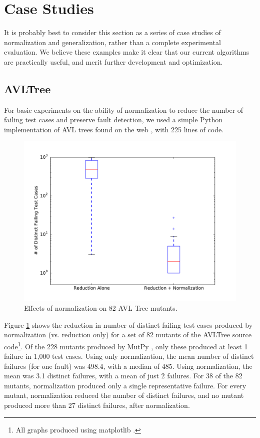 \section {Case Studies}

It is probably best to consider this section as a series of case
studies of normalization and generalization, rather than a complete
experimental evaluation.  We believe these examples make it clear that
our current algorithms are practically useful, and merit further
development and optimization.

\subsection{AVLTree}

For basic experiments on the ability of normalization to reduce the
number of failing test cases and preserve fault detection, we used a
simple Python implementation of AVL trees found on the web
\cite{avltree}, with 225 lines of code.

\begin{figure}
\includegraphics[width=\columnwidth]{length}
\caption{Effects of normalization on 82 AVL Tree mutants.}
\label{normeffect}
\end{figure}

Figure \ref{normeffect} shows the reduction in number of distinct
failing test cases produced by normalization (vs. reduction only) for a
set of 82 mutants of the AVLTree source code\footnote{All graphs
  produced using matplotlib \cite{Hunter:2007}.}.  Of the 228 mutants
produced by MutPy \cite{mutpy}, only these produced at least 1 failure
in 1,000 test cases.  Using only normalization, the mean number of
distinct failures (for one fault) was 498.4, with a median of 485.
Using normalization, the mean was 3.1 distinct failures, with a mean
of just 2 failures.  For 38 of the 82 mutants, normalization produced
only a single representative failure.  For every mutant, normalization
reduced the number of distinct failures, and no mutant produced more
than 27 distinct failures, after normalization.


